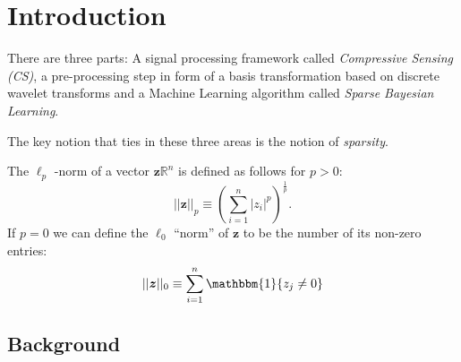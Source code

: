 \chapter{Introduction}

There are three parts: A signal processing framework called \emph{Compressive Sensing (CS)}, a pre-processing step in form of a basis transformation based on discrete wavelet transforms and a Machine Learning algorithm called \emph{Sparse Bayesian Learning}.

The key notion that ties in these three areas is the notion of \emph{sparsity}.

The $\ell_p$ -norm of a vector $\bm z \mathbb{R}^n$ is defined as follows for $p>0$:
\begin{equation}
\label{eqn:lp-norm}
  ||\bm z||_p \equiv \left( \sum_{i=1}^n |z_i|^p \right)^\frac{1}{p}.
\end{equation}
If $p=0$ we can define the $\ell_0$ ``norm'' of $\bm z$ to be the number of its non-zero entries:
\begin{equation}
\label{eqn:l0-norm}
  ||\bm z||_0 \equiv  \sum_{i=1}^n \mathbbm{1}\{z_j \neq 0\}
\end{equation}


\section*{Background}
